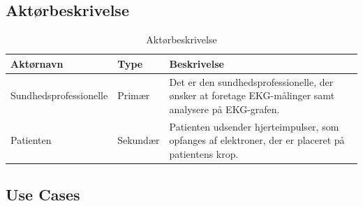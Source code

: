 \subsection{Aktørbeskrivelse}

\begin{table}[H]
\begin{tabularx}{\textwidth}{l l X}
     Aktørnavn  & Type      & Beskrivelse \\ \midrule
     Sundhedsprofessionelle   & Primær    & Det er den sundhedsprofessionelle, der ønsker at foretage EKG-målinger samt analysere på EKG-grafen.\\ 						  									  \addlinespace[2mm]
     Patienten & Sekundær  & Patienten udsender hjerteimpulser, som opfanges af elektroner, der er placeret på patientens krop.\\                                                                                                                                                                            
   
     \bottomrule                                                                                                                   
    \end{tabularx}
    \caption {Aktørbeskrivelse}
    \label{tab:aktoerbeskrivelse}
	
\end{table}

\subsection{Use Cases}

